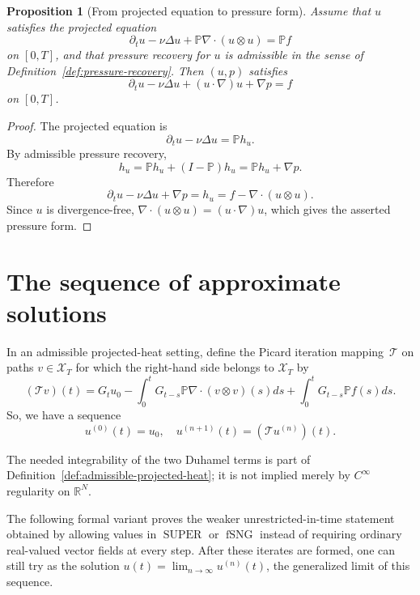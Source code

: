 \documentclass{amsart}
\newtheorem{prop}{Proposition}
\DeclareMathOperator{\SUPER}{SUPER}
\DeclareMathOperator{\fSNG}{fSNG}
\begin{document}
\begin{prop}[From projected equation to pressure form]\label{prop:pressure-recovery}
Assume that $u$ satisfies the projected equation
\[
  \partial_tu-\nu\Delta u+\mathbb{P}\nabla\cdot(u\otimes u)=\mathbb{P}f
\]
on $[0,T]$, and that pressure recovery for $u$ is admissible in the sense of
Definition~\ref{def:pressure-recovery}.  Then $(u,p)$ satisfies
\[
  \partial_tu-\nu\Delta u+(u\cdot\nabla)u+\nabla p=f
\]
on $[0,T]$.
\end{prop}

\begin{proof}
The projected equation is
\[
  \partial_tu-\nu\Delta u=\mathbb{P}h_u .
\]
By admissible pressure recovery,
\[
  h_u=\mathbb{P}h_u+(I-\mathbb{P})h_u
      =\mathbb{P}h_u+\nabla p .
\]
Therefore
\[
  \partial_tu-\nu\Delta u+\nabla p=h_u
  =f-\nabla\cdot(u\otimes u).
\]
Since $u$ is divergence-free, $\nabla\cdot(u\otimes u)=(u\cdot\nabla)u$,
which gives the asserted pressure form.
\end{proof}

\section{The sequence of approximate solutions}

In an admissible projected-heat setting, define the Picard iteration
mapping~$\mathcal{T}$ on paths $v\in\mathcal X_T$ for which the right-hand side
belongs to $\mathcal X_T$ by
\begin{equation*}
(\mathcal{T}v)(t) = G_t u_0 - \int_0^t G_{t-s}\mathbb{P}\nabla\cdot(v\otimes v)(s)ds + \int_0^t G_{t-s}\mathbb{P}f(s)ds.
\end{equation*}
So, we have a sequence
\[ u^{(0)}(t) = u_0,\quad u^{(n+1)}(t) = (\mathcal{T}u^{(n)})(t). \]

The needed integrability of the two Duhamel terms is part of
Definition~\ref{def:admissible-projected-heat}; it is not implied merely by
$C^\infty$ regularity on $\mathbb{R}^N$.

The following formal variant proves the weaker unrestricted-in-time statement
obtained by allowing values in $\SUPER$ or $\fSNG$ instead of requiring
ordinary real-valued vector fields at every step.  After these iterates are
formed, one can still try as the solution
$u(t)=\lim_{n\to\infty}u^{(n)}(t)$, the generalized limit of this sequence.
\end{document}
